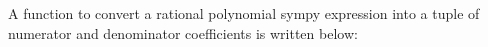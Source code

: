 \documentclass[11pt]{article}
\begin{document}
	

	
		
    A function to convert a rational polynomial sympy expression into a
tuple of numerator and denominator coefficients is written below:

	

	
		
	
	
		
	
		
			
		
	
		
			
		
	
		
			
		
	
		
			
		
	
		
			
		
	
		
			
		
	
		
			
		
	
		
			
		
	
		
			
		
	
		
			
		
	
		
			
		
	
		
			
		
	
		
			
		
	
		
			
		
	
		
			
		
	
		
			
		
	
		
			
		
	
		
			
		
	
\end{document}
